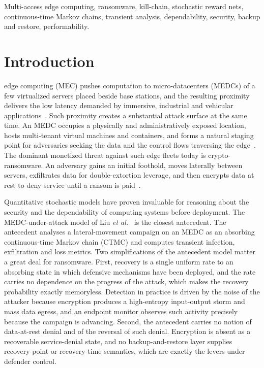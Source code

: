 \documentclass[journal]{IEEEtran}
\begin{document}
\begin{IEEEkeywords}
Multi-access edge computing, ransomware, kill-chain, stochastic reward nets,
continuous-time Markov chains, transient analysis, dependability, security,
backup and restore, performability.
\end{IEEEkeywords}

\section{Introduction}
 edge computing (MEC) pushes computation to
micro-datacenters (MEDCs) of a few virtualized servers placed beside base
stations, and the resulting proximity delivers the low latency demanded by
immersive, industrial and vehicular applications~\cite{mao2017survey,taleb2017mec}.
Such proximity creates a substantial attack surface at the same time. An MEDC
occupies a physically and administratively exposed location, hosts multi-tenant
virtual machines and containers, and forms a natural staging point for
adversaries seeking the data and the control flows traversing the
edge~\cite{roman2018survey}. The dominant monetized threat against such edge
fleets today is crypto-ransomware. An adversary gains an initial foothold, moves laterally
between servers, exfiltrates data for double-extortion leverage, and then
encrypts data at rest to deny service until a ransom is
paid~\cite{kharraz2015gordian,alrimy2018ransomware,razaulla2023age}.

Quantitative stochastic models have proven invaluable for reasoning about the
security and the dependability of computing systems before deployment. The
MEDC-under-attack model of Liu \emph{et al.}~\cite{liu2021transient} is the
closest antecedent. The antecedent analyses a lateral-movement campaign on an
MEDC as an absorbing continuous-time Markov chain (CTMC) and computes transient
infection, exfiltration and loss metrics. Two simplifications of the antecedent
model matter a great deal for ransomware. First, recovery is a single uniform rate to an absorbing
state in which defensive mechanisms have been deployed, and the rate carries no
dependence on the progress of the attack, which makes the recovery probability
exactly memoryless. Detection in practice is driven by the noise of the attacker
because encryption produces a high-entropy input-output storm and mass data
egress, and an endpoint monitor observes such activity precisely because the
campaign is advancing. Second, the antecedent carries no notion of data-at-rest
denial and of the reversal of such denial. Encryption is absent as a recoverable
service-denial state, and no backup-and-restore layer supplies recovery-point or
recovery-time semantics, which are exactly the levers under defender control.
\end{document}
